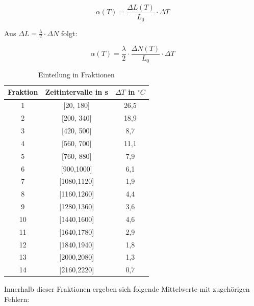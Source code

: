 \begin{equation}
\alpha(T)=\frac{\Delta L(T)}{L_{0}} \cdot \Delta T
\end{equation}

Aus $ \Delta L = \frac{\lambda}{2} \cdot \Delta N $ folgt:

\begin{equation}
\alpha (T)= \frac{\lambda}{2} \cdot \frac{\Delta N(T)}{L_0} \cdot \Delta T
\end{equation}

\begin{table}
\begin{tabular}{|c|c|c|}
\hline
Fraktion&	Zeitintervalle in s	& $\Delta T $ in $ ^{\circ} C$ \\
\hline
1		&[20, 180]		&26,5\\
\hline
2		&[200, 340]		&18,9\\
\hline
3		&[420, 500]		&8,7\\
\hline
4		&[560, 700]		&11,1\\
\hline
5		&[760, 880]		&7,9\\
\hline
6		&[900,1000]		&6,1\\
\hline
7		&[1080,1120]		&1,9\\
\hline
8		&[1160,1260]		&4,4\\
\hline
9		&[1280,1360]		&3,6\\
\hline
10		&[1440,1600]		&4,6\\
\hline
11		&[1640,1780]		&2,9\\
\hline
12		&[1840,1940]		&1,8\\
\hline
13		&[2000,2080]		&1,3\\
\hline
14		&[2160,2220]		&0,7\\
\hline
\end{tabular}

\caption{Einteilung in Fraktionen}
\label{tbl_2}
\end{table}



Innerhalb dieser Fraktionen ergeben sich folgende Mittelwerte mit zugehörigen Fehlern:

